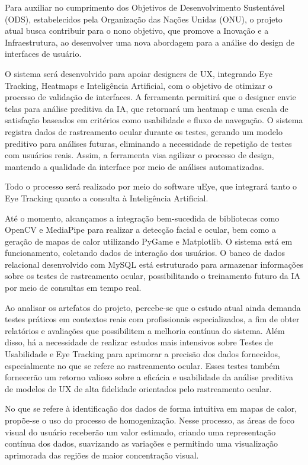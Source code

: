 Para auxiliar no cumprimento dos Objetivos de Desenvolvimento Sustentável (ODS), estabelecidos pela Organização das Nações Unidas (ONU), o projeto atual busca contribuir para o nono objetivo, que promove a Inovação e a Infraestrutura, ao desenvolver uma nova abordagem para a análise do design de interfaces de usuário. \textcite{ODS2024}

O sistema será desenvolvido para apoiar designers de UX, integrando Eye Tracking, Heatmaps e Inteligência Artificial, com o objetivo de otimizar o processo de validação de interfaces. A ferramenta permitirá que o designer envie telas para análise preditiva da IA, que retornará um heatmap e uma escala de satisfação baseados em critérios como usabilidade e fluxo de navegação. O sistema registra dados de rastreamento ocular durante os testes, gerando um modelo preditivo para análises futuras, eliminando a necessidade de repetição de testes com usuários reais. Assim, a ferramenta visa agilizar o processo de design, mantendo a qualidade da interface por meio de análises automatizadas.

Todo o processo será realizado por meio do software uEye, que integrará tanto o Eye Tracking quanto a consulta à Inteligência Artificial.

Até o momento, alcançamos a integração bem-sucedida de bibliotecas como OpenCV e MediaPipe para realizar a detecção facial e ocular, bem como a geração de mapas de calor utilizando PyGame e Matplotlib. O sistema está em funcionamento, coletando dados de interação dos usuários. O banco de dados relacional desenvolvido com MySQL está estruturado para armazenar informações sobre os testes de rastreamento ocular, possibilitando o treinamento futuro da IA por meio de consultas em tempo real.

Ao analisar os artefatos do projeto, percebe-se que o estudo atual ainda demanda testes práticos em contextos reais com profissionais especializados, a fim de obter relatórios e avaliações que possibilitem a melhoria contínua do sistema. Além disso, há a necessidade de realizar estudos mais intensivos sobre Testes de Usabilidade e Eye Tracking para aprimorar a precisão dos dados fornecidos, especialmente no que se refere ao rastreamento ocular. Esses testes também fornecerão um retorno valioso sobre a eficácia e usabilidade da análise preditiva de modelos de UX de alta fidelidade orientados pelo rastreamento ocular.

No que se refere à identificação dos dados de forma intuitiva em mapas de calor, propõe-se o uso do processo de homogenização. Nesse processo, as áreas de foco visual do usuário receberão um valor estimado, criando uma representação contínua dos dados, suavizando as variações e permitindo uma visualização aprimorada das regiões de maior concentração visual.

